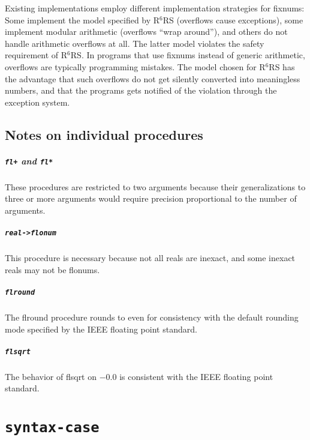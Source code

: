 \documentclass[twoside,twocolumn]{algol60}
\newcommand{\rn}[1]{R$^{#1}$RS}
\begin{document}
Existing implementations employ different implementation strategies
for fixnums: Some implement the model specified by \rn{6} (overflows
cause exceptions), some implement modular arithmetic (overflows ``wrap
around''), and others do not handle arithmetic overflows at all.  The
latter model violates the safety requirement of \rn{6}.  In programs
that use fixnums instead of generic arithmetic, overflows are
typically programming mistakes.  The model chosen for \rn{6} has the
advantage that such overflows do not get silently converted into
meaningless numbers, and that the programs gets notified of the
violation through the exception system.

\section{Notes on individual procedures}

\paragraph{{\tt fl+} and {\tt fl*}}

These procedures are restricted to two arguments because their
generalizations to three or more arguments would require
precision proportional to the number of arguments.

\paragraph{{\tt real->flonum}}

This procedure is necessary because not all reals are inexact, and
some inexact reals may not be flonums.

\paragraph{{\tt flround}}

The {\cf flround} procedure rounds to even for consistency with the default rounding
mode specified by the IEEE floating point standard.

\paragraph{{\tt flsqrt}}

The behavior of {\cf flsqrt} on $-0.0$ is consistent with the IEEE
floating point standard.


\chapter{{\tt syntax-case}}
\end{document}
